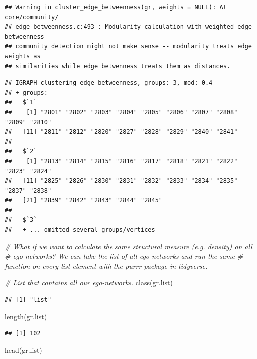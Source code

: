 \documentclass[
]{book}
\newenvironment{Shaded}{\begin{snugshade}}{\end{snugshade}}
\newcommand{\CommentTok}[1]{\textcolor[rgb]{0.56,0.35,0.01}{\textit{#1}}}
\newcommand{\FunctionTok}[1]{\textcolor[rgb]{0.00,0.00,0.00}{#1}}
\newcommand{\NormalTok}[1]{#1}
\begin{document}
\begin{verbatim}
## Warning in cluster_edge_betweenness(gr, weights = NULL): At core/community/
## edge_betweenness.c:493 : Modularity calculation with weighted edge betweenness
## community detection might not make sense -- modularity treats edge weights as
## similarities while edge betwenness treats them as distances.
\end{verbatim}

\begin{verbatim}
## IGRAPH clustering edge betweenness, groups: 3, mod: 0.4
## + groups:
##   $`1`
##    [1] "2801" "2802" "2803" "2804" "2805" "2806" "2807" "2808" "2809" "2810"
##   [11] "2811" "2812" "2820" "2827" "2828" "2829" "2840" "2841"
##   
##   $`2`
##    [1] "2813" "2814" "2815" "2816" "2817" "2818" "2821" "2822" "2823" "2824"
##   [11] "2825" "2826" "2830" "2831" "2832" "2833" "2834" "2835" "2837" "2838"
##   [21] "2839" "2842" "2843" "2844" "2845"
##   
##   $`3`
##   + ... omitted several groups/vertices
\end{verbatim}

\begin{Shaded}
\begin{Highlighting}[]
\CommentTok{\# What if we want to calculate the same structural measure (e.g. density) on all}
\CommentTok{\# ego{-}networks? We can take the list of all ego{-}networks and run the same }
\CommentTok{\# function on every list element with the purrr package in tidyverse.}

\CommentTok{\# List that contains all our ego{-}networks.}
\FunctionTok{class}\NormalTok{(gr.list)}
\end{Highlighting}
\end{Shaded}

\begin{verbatim}
## [1] "list"
\end{verbatim}

\begin{Shaded}
\begin{Highlighting}[]
\FunctionTok{length}\NormalTok{(gr.list)}
\end{Highlighting}
\end{Shaded}

\begin{verbatim}
## [1] 102
\end{verbatim}

\begin{Shaded}
\begin{Highlighting}[]
\FunctionTok{head}\NormalTok{(gr.list)}
\end{Highlighting}
\end{Shaded}
\end{document}
